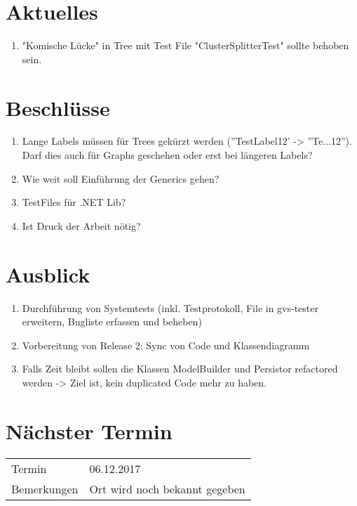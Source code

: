 \documentclass[11pt, a4paper,oneside]{scrartcl}
\begin{document}
	\section{Aktuelles}
		\begin{enumerate}
		\item "Komische Lücke" in Tree mit Test File "ClusterSplitterTest" sollte behoben sein.
	\end{enumerate} 
	
	\section{Beschlüsse}
	\begin{enumerate}
		\item Lange Labels müssen für Trees gekürzt werden (''TestLabel12' -> ''Te...12''). Darf dies auch für Graphs geschehen oder erst bei längeren Labels?
		\item Wie weit soll Einführung der Generics gehen?
		\item TestFiles für .NET Lib?
		\item Ist Druck der Arbeit nötig?
	\end{enumerate} 
	
	\section{Ausblick}
	\begin{enumerate}
		\item Durchführung von Systemtests (inkl. Testprotokoll, File in gvs-tester erweitern, Bugliste erfassen und beheben)
		\item Vorbereitung von Release 2: Sync von Code und Klassendiagramm
		\item Falls Zeit bleibt sollen die Klassen ModelBuilder und Persistor refactored werden -> Ziel ist, kein duplicated Code mehr zu haben.
	\end{enumerate}
	
	\section{Nächster Termin}
	\begin{tabu} to \linewidth {l X }
		\toprule
		Termin & 06.12.2017  \\
		Bemerkungen & Ort wird noch bekannt gegeben  \\
		\bottomrule
	\end{tabu}
	
\end{document}
